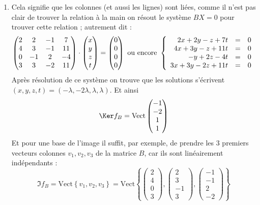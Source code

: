 {{\begin{enumerate}
\begin{enumerate}
     \item Cela signifie que les colonnes (et aussi les lignes) sont liées, comme il n'est pas clair
de trouver la relation à la main on résout le système $B X = 0$ pour trouver cette relation ; autrement dit :
$$\begin{pmatrix} 
2 & 2 & -1 & 7  \cr
4 & 3 & -1 & 11 \cr
0 & -1 & 2 & -4 \cr
3 & 3 & -2 & 11 \cr 
\end{pmatrix}
\cdot 
\begin{pmatrix} x\\y\\z\\t \end{pmatrix} = 
\begin{pmatrix} 0\\0\\0\\0 \end{pmatrix}
\text{ ou encore }
\left\{ 
\begin{array}{rcl}
2x + 2y -z + 7t  &=& 0  \cr
4x + 3y -z + 11t &=& 0 \cr
     -y +2z -4t  &=& 0  \cr
3x + 3y -2z+ 11t &=& 0  \cr   
\end{array}
\right.$$
Après résolution de ce système on trouve que 
les solutions s'écrivent $(x,y,z,t)= (-\lambda,-2\lambda,\lambda,\lambda)$.
Et ainsi 
$$\Ker f_B = \textrm{Vect} \begin{pmatrix}-1\\-2\\1\\1\end{pmatrix}$$
Et pour une base de l'image il suffit, par exemple, de prendre les $3$ premiers vecteurs colonnes $v_1,v_2,v_3$ 
de la matrice $B$, car ils sont linéairement indépendants :
$$\Im f_B = \textrm{Vect} \left\{ v_1, v_2, v_3 \right\} = 
\textrm{Vect} \left\{  
\begin{pmatrix}2\\4\\0\\3\end{pmatrix},  
\begin{pmatrix}2\\3\\-1\\3\end{pmatrix},
\begin{pmatrix}-1\\-1\\2\\-2\end{pmatrix} 
\right\}
$$

  \end{enumerate}
\end{enumerate}}
}